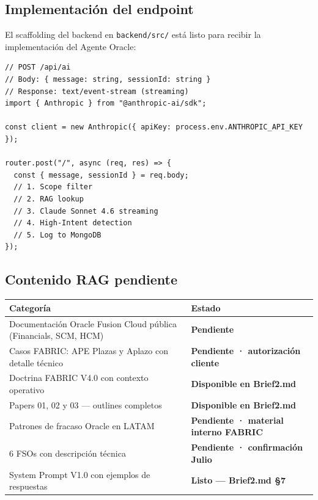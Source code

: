 \documentclass[11pt, a4paper]{article}
\newcommand{\ruta}[1]{\texttt{\color{accent2}#1}}
\begin{document}
\subsection{Implementación del endpoint}

El scaffolding del backend en \ruta{backend/src/} está listo para recibir
la implementación del Agente Oracle:

\begin{lstlisting}[caption={backend/src/routes/ai.ts — a implementar}]
// POST /api/ai
// Body: { message: string, sessionId: string }
// Response: text/event-stream (streaming)
import { Anthropic } from "@anthropic-ai/sdk";

const client = new Anthropic({ apiKey: process.env.ANTHROPIC_API_KEY });

router.post("/", async (req, res) => {
  const { message, sessionId } = req.body;
  // 1. Scope filter
  // 2. RAG lookup
  // 3. Claude Sonnet 4.6 streaming
  // 4. High-Intent detection
  // 5. Log to MongoDB
});
\end{lstlisting}

\subsection{Contenido RAG pendiente}

\begin{table}[h]
\centering
\begin{tabularx}{\linewidth}{X >{\small\bfseries\color{danger}}l}
\toprule
Categoría & Estado \\
\midrule
Documentación Oracle Fusion Cloud pública (Financials, SCM, HCM) & Pendiente \\
Casos FABRIC: APE Plazas y Aplazo con detalle técnico & Pendiente · autorización cliente \\
Doctrina FABRIC V4.0 con contexto operativo & Disponible en Brief2.md \\
Papers 01, 02 y 03 — outlines completos & Disponible en Brief2.md \\
Patrones de fracaso Oracle en LATAM & Pendiente · material interno FABRIC \\
6 FSOs con descripción técnica & Pendiente · confirmación Julio \\
System Prompt V1.0 con ejemplos de respuestas & Listo — Brief2.md §7 \\
\bottomrule
\end{tabularx}
\end{table}

\newpage
\end{document}
